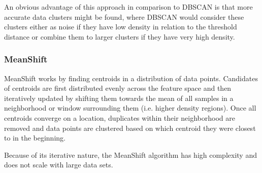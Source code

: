 An obvious advantage of this approach in comparison to DBSCAN is that more accurate data clusters might be found, where DBSCAN would consider these clusters either as noise if they have low density in relation to the threshold distance or combine them to larger clusters if they have very high density.

\subsubsection{MeanShift}
MeanShift works by finding centroids in a distribution of data points. Candidates of centroids are first distributed evenly across the feature space and then iteratively updated by shifting them towards the mean of all samples in a neighborhood or window surrounding them (i.e. higher density regions). Once all centroids converge on a location, duplicates within their neighborhood are removed and data points are clustered based on which centroid they were closest to in the beginning.\cite{seif_2021}

Because of its iterative nature, the MeanShift algorithm has high complexity and does not scale with large data sets.